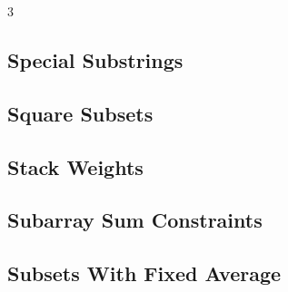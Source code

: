 \documentclass[8pt]{extarticle}
\begin{document}
\begin{multicols*}{3}
\subsection{Special Substrings}
\begin{caixaenunciado}

\end{caixaenunciado}
\vspace{0.3cm}


\subsection{Square Subsets}
\begin{caixaenunciado}

\end{caixaenunciado}
\vspace{0.3cm}


\subsection{Stack Weights}
\begin{caixaenunciado}

\end{caixaenunciado}
\vspace{0.3cm}


\subsection{Subarray Sum Constraints}
\begin{caixaenunciado}

\end{caixaenunciado}
\vspace{0.3cm}


\subsection{Subsets With Fixed Average}
\begin{caixaenunciado}

\end{caixaenunciado}
\vspace{0.3cm}



\end{multicols*}
\end{document}
